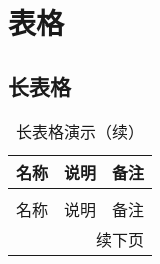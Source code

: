 \chapter{表格}
\section{长表格}
\begin{longtable}{ccc}
\caption[长表格演示]{长表格演示} \label{tab:longtable1} \\
\toprule[1.5pt]
名称  & 说明 & 备注\\
\midrule[1pt]
\endfirsthead
\caption[]{长表格演示（续）} \\
\toprule[1.5pt]
名称  & 说明 & 备注 \\
\midrule[1pt]
\endhead
\hline
\multicolumn{3}{r}{\small 续下页}
\endfoot
\bottomrule[1.5pt]
\endlastfoot


\end{longtable}
